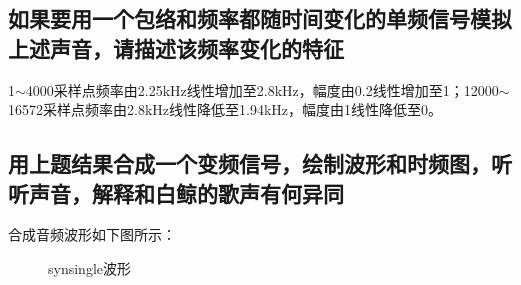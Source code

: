 \documentclass{article}
\begin{document}
        \subsection{如果要用一个包络和频率都随时间变化的单频信号模拟上述声音，请描述该频率变化的特征}
            1$\sim$4000采样点频率由2.25kHz线性增加至2.8kHz，幅度由0.2线性增加至1；12000$\sim$16572采样点频率由2.8kHz线性降低至1.94kHz，幅度由1线性降低至0。

        \subsection{用上题结果合成一个变频信号，绘制波形和时频图，听听声音，解释和白鲸的歌声有何异同}
            合成音频波形如下图所示：
            \begin{figure}[htb]
                \centering
                \hspace{10pt}
                \caption{synsingle波形}
                \label{fig:synsingle}
            \end{figure}
\end{document}
